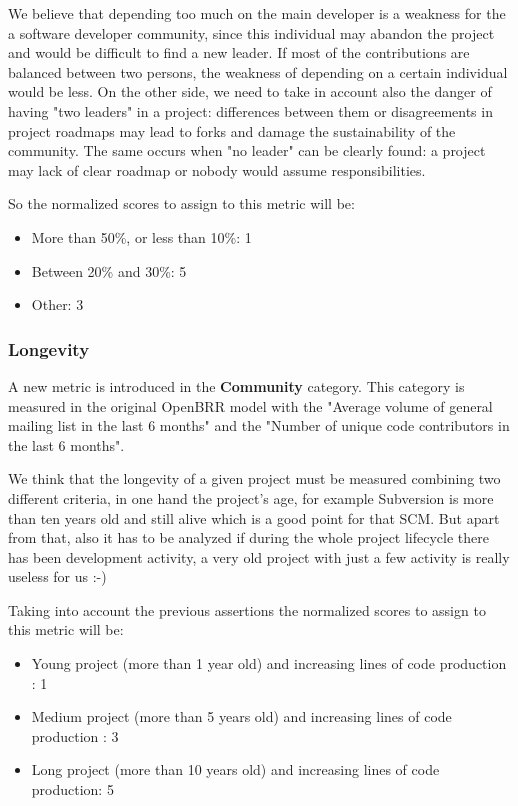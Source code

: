 \documentclass[a4paper,10pt]{article}
\begin{document}
We believe that depending too much on the main developer is a weakness for the a
software developer community, since this individual may abandon the project and
would be difficult to find a new leader. If most of the contributions are
balanced between two persons, the weakness of depending on a certain individual
would be less. On the other side, we need to take in account also the danger of
having "two leaders" in a project: differences between them or disagreements in
project roadmaps may lead to forks and damage the sustainability of the
community. The same occurs when "no leader" can be clearly found: a project may
lack of clear roadmap or nobody would assume responsibilities.

So the normalized scores to assign to this metric will be:
\begin{itemize}
 \item More than 50\%, or less than 10\%: 1
 \item Between 20\% and 30\%: 5
 \item Other: 3
\end{itemize}

\subsubsection{Longevity}
\label{NewMetricEparrillae1}
A new metric is introduced in the \textbf{Community} category. This category is measured in the original OpenBRR model with the "Average volume of general mailing list in the last 6 months" and the "Number of unique code contributors in the last 6 months". 

We think that the longevity of a given project must be measured combining two
different criteria, in one hand the project's age, for example Subversion is
more than ten years old and still alive which is a good point for that SCM. But
apart from that, also it has to be analyzed if during the whole project
lifecycle there has been development activity, a very old project with just a
few activity is really useless for us :-)

Taking into account the previous assertions the normalized scores to assign to this metric will be:
\begin{itemize}
 \item Young project (more than 1 year old) and increasing lines of code production : 1
  \item Medium project (more than 5 years old) and increasing lines of code production : 3
 \item Long project (more than 10 years old) and increasing lines of code production: 5
\end{itemize}
\end{document}
